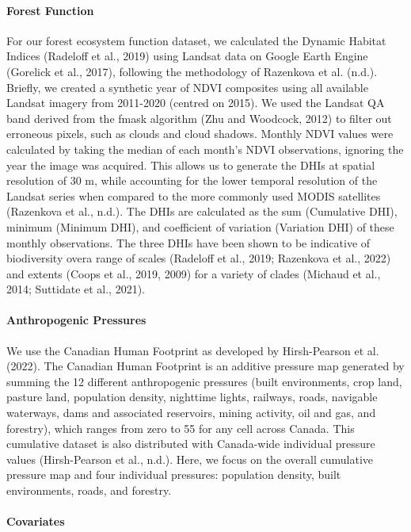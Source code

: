 \documentclass[
]{agujournal2019}
\let\oldparagraph\paragraph
\renewcommand{\paragraph}[1]{\oldparagraph{#1}\mbox{}}
\begin{document}
\paragraph{Forest Function}\label{forest-function}

For our forest ecosystem function dataset, we calculated the Dynamic
Habitat Indices (Radeloff et al., 2019) using Landsat data on Google
Earth Engine (Gorelick et al., 2017), following the methodology of
Razenkova et al. (n.d.). Briefly, we created a synthetic year of NDVI
composites using all available Landsat imagery from 2011-2020 (centred
on 2015). We used the Landsat QA band derived from the fmask algorithm
(Zhu and Woodcock, 2012) to filter out erroneous pixels, such as clouds
and cloud shadows. Monthly NDVI values were calculated by taking the
median of each month's NDVI observations, ignoring the year the image
was acquired. This allows us to generate the DHIs at spatial resolution
of 30 m, while accounting for the lower temporal resolution of the
Landsat series when compared to the more commonly used MODIS satellites
(Razenkova et al., n.d.). The DHIs are calculated as the sum (Cumulative
DHI), minimum (Minimum DHI), and coefficient of variation (Variation
DHI) of these monthly observations. The three DHIs have been shown to be
indicative of biodiversity overa range of scales (Radeloff et al., 2019;
Razenkova et al., 2022) and extents (Coops et al., 2019, 2009) for a
variety of clades (Michaud et al., 2014; Suttidate et al., 2021).

\paragraph{Anthropogenic Pressures}\label{anthropogenic-pressures}

We use the Canadian Human Footprint as developed by Hirsh-Pearson et al.
(2022). The Canadian Human Footprint is an additive pressure map
generated by summing the 12 different anthropogenic pressures (built
environments, crop land, pasture land, population density, nighttime
lights, railways, roads, navigable waterways, dams and associated
reservoirs, mining activity, oil and gas, and forestry), which ranges
from zero to 55 for any cell across Canada. This cumulative dataset is
also distributed with Canada-wide individual pressure values
(Hirsh-Pearson et al., n.d.). Here, we focus on the overall cumulative
pressure map and four individual pressures: population density, built
environments, roads, and forestry.

\paragraph{Covariates}\label{covariates}
\end{document}
